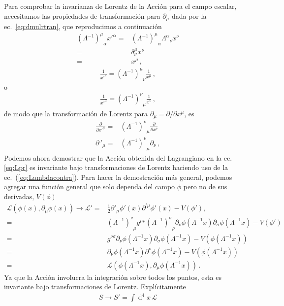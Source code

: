 \begin{frame}
Para comprobar la invarianza de Lorentz de la Acción para el campo escalar, necesitamos las propiedades de transformación para $\partial_\mu$ dada por la ec.~\eqref{eq:dmulrtran}, que reproducimos a continuación
\begin{align}
  {\left(\Lambda^{-1}\right)^\mu}_\alpha{x'}^\alpha=&{\left(\Lambda^{-1}\right)^\mu}_\alpha{\Lambda^\alpha}_\nu x^\nu\nonumber\\
=&\delta^\mu_\nu x^\nu\nonumber\\
=&x^\mu\,,
\end{align}
\begin{align}
  \frac{1}{{x'}^\nu}= {\left(\Lambda^{-1}\right)^\mu}_\nu\frac{1}{x^\mu}\,,
\end{align}
o
\begin{align}
  \label{eq:183qft}
    \frac{1}{{x'}^\mu}= {\left(\Lambda^{-1}\right)^\nu}_\mu\frac{1}{x^\nu}\,,
\end{align}
de modo que la transformación de Lorentz para $\partial_\mu=\partial/\partial x^\mu$, es
\begin{align}
     \frac{\partial}{{\partial x'}^\mu}=& {\left(\Lambda^{-1}\right)^\nu}_\mu\frac{\partial}{\partial x^\nu}\nonumber\\
   {\partial\,}'_\mu=& {\left(\Lambda^{-1}\right)^\nu}_\mu\partial_\nu\,,
\end{align}
Podemos ahora demostrar que la Acción obtenida del Lagrangiano en la ec.\eqref{eq:Lpr} es invariante bajo transformaciones de Lorentz haciendo uso de la ec.~(\ref{eq:Lambdacontra}). Para hacer la demostración más general, podemos agregar una función general que solo dependa del campo $\phi$ pero no de sus derivadas, $V(\phi)$
\begin{align}
  \mathcal{L}(\phi(x),\partial_{\mu}\phi(x))\to  \mathcal{L}'=& \frac{1}{2}\partial'_\mu\phi'(x)\partial^{'\mu}\phi'(x)-V(\phi'), \nonumber\\
  =&{\left(\Lambda^{-1}\right)^\nu}_\mu g^{\mu \rho}{\left(\Lambda^{-1}\right)^\sigma}_\rho \partial_\nu\phi(\Lambda^{-1}x) \partial_\sigma \phi(\Lambda^{-1}x) -V(\phi')\nonumber\\
  =& g^{\nu \sigma}\partial_\nu\phi(\Lambda^{-1}x) \partial_\sigma \phi(\Lambda^{-1}x) -V(\phi(\Lambda^{-1}x))\nonumber\\
  =& \partial_\nu\phi(\Lambda^{-1}x) \partial^{\nu} \phi(\Lambda^{-1}x) -V(\phi(\Lambda^{-1}x)) \nonumber\\
  =&\mathcal{L}(\phi(\Lambda^{-1}x),\partial_{\mu}\phi(\Lambda^{-1}x))\,.
\end{align}
Ya que la Acción involucra la integración sobre todos los puntos, esta es invariante bajo transformaciones de Lorentz. Explícitamente
\begin{align}
  S\to S'=\int \operatorname{d}^4x\, \mathcal{L}
\end{align}


\end{frame}
